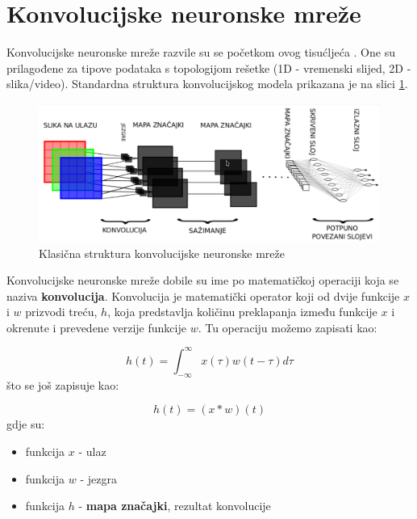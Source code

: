 \section{Konvolucijske neuronske mreže}

Konvolucijske neuronske mreže razvile su se početkom ovog tisućljeća \citep{ObjectRecognition}. One su prilagođene za tipove podataka s topologijom rešetke (1D - vremenski slijed, 2D - slika/video). Standardna struktura konvolucijskog modela prikazana je na slici \ref{img:cnn}.

\begin{figure}[htb]
\centering
\includegraphics[width=12cm]{img/CNN.png}
\caption{Klasična struktura konvolucijske neuronske mreže \citep{duPredavanja}}
\label{img:cnn}
\end{figure}

Konvolucijske neuronske mreže dobile su ime po matematičkoj operaciji koja se naziva \textbf{konvolucija}. Konvolucija je matematički operator koji od dvije funkcije $x$ i $w$ prizvodi treću, $h$, koja predstavlja količinu preklapanja između funkcije $x$ i okrenute i prevedene verzije funkcije $w$. Tu operaciju možemo zapisati kao:

\begin{equation}
h(t) = \int_{-\infty}^{\infty} x(\tau)w(t - \tau)d\tau
\label{eq:conv_1}
\end{equation}
što se još zapisuje kao:

\begin{equation}
h(t) = (x * w)(t)
\label{eq:conv_2}
\end{equation}
gdje su:

\begin{itemize}
\item funkcija $x$ - ulaz
\item funkcija $w$ - jezgra
\item funkcija $h$ - \textbf{mapa značajki}, rezultat konvolucije
\end{itemize}

